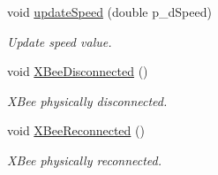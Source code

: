 \begin{DoxyCompactItemize}
void \hyperlink{class_communication_control_aaed9f8ace9b8f80d55fe245b065ae759}{update\-Speed} (double p\-\_\-d\-Speed)
\begin{DoxyCompactList}\small\item\em Update speed value. \end{DoxyCompactList}\item 
void \hyperlink{class_communication_control_ac02486c2c7dd921a78a108bc60d843a7}{X\-Bee\-Disconnected} ()
\begin{DoxyCompactList}\small\item\em X\-Bee physically disconnected. \end{DoxyCompactList}\item 
void \hyperlink{class_communication_control_a852eb0e0e7095e01dd1fba158aae5ec5}{X\-Bee\-Reconnected} ()
\begin{DoxyCompactList}\small\item\em X\-Bee physically reconnected. \end{DoxyCompactList}\end{DoxyCompactItemize}
